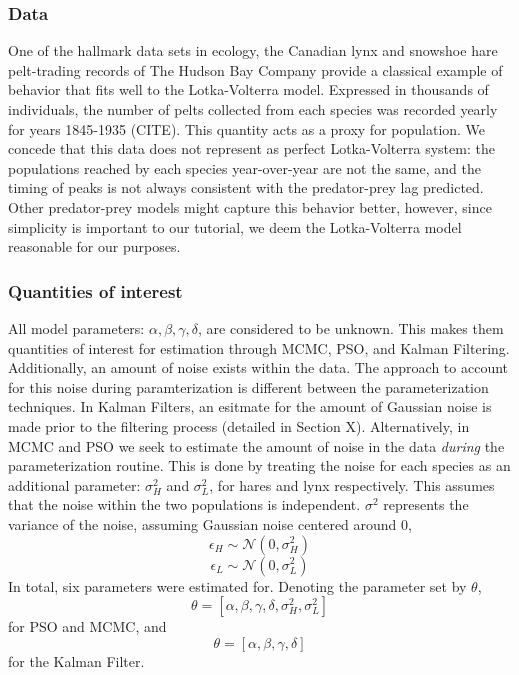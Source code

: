 \documentclass{article}
\begin{document}
\subsubsection{Data}
One of the hallmark data sets in ecology, the Canadian lynx and snowshoe hare pelt-trading records of The Hudson Bay Company provide a classical example of behavior that fits well to the Lotka-Volterra model. Expressed in thousands of individuals, the number of pelts collected from each species was recorded yearly for years 1845-1935 (CITE). This quantity acts as a proxy for population. We concede that this data does not represent as perfect Lotka-Volterra system: the populations reached by each species year-over-year are not the same, and the timing of peaks is not always consistent with the predator-prey lag predicted. Other predator-prey models might capture this behavior better, however, since simplicity is important to our tutorial, we deem the Lotka-Volterra model reasonable for our purposes. 

\subsubsection{Quantities of interest}
All model parameters: $\alpha, \beta, \gamma, \delta$, are considered to be unknown. This makes them quantities of interest for estimation through MCMC, PSO, and Kalman Filtering. Additionally, an amount of noise exists within the data. The approach to account for this noise during paramterization is different between the parameterization techniques. In Kalman Filters, an esitmate for the amount of Gaussian noise is made prior to the filtering process (detailed in Section X). Alternatively, in MCMC and PSO we seek to estimate the amount of noise in the data \emph{during} the parameterization routine. This is done by treating the noise for each species as an additional parameter: $\sigma^{2}_{H}$ and $\sigma^{2}_{L}$, for hares and lynx respectively. This assumes that the noise within the two populations is independent. $\sigma^{2}$ represents the variance of the noise, assuming Gaussian noise centered around 0,
\begin{equation}
\epsilon_{H}\sim\mathcal{N}(0,\sigma_{H}^{2})
\end{equation}
\begin{equation}
\epsilon_{L}\sim\mathcal{N}(0,\sigma_{L}^{2})
\end{equation}
In total, six parameters were estimated for. Denoting the parameter set by $\theta$,
\begin{equation}
\theta = [\alpha, \beta, \gamma, \delta, \sigma_{H}^{2}, \sigma_{L}^{2}]
\end{equation}
for PSO and MCMC, and 
\begin{equation}
\theta = [\alpha, \beta, \gamma, \delta]
\end{equation}
for the Kalman Filter.
\end{document}
